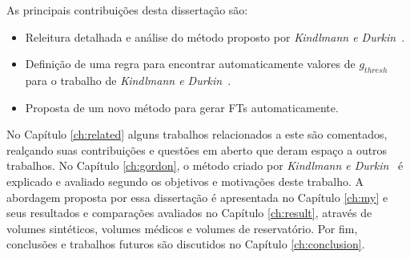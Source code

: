     As principais contribuições desta dissertação são:
\begin{itemize}
   	\item Releitura detalhada e análise do método proposto por \textit{Kindlmann e Durkin}~\cite{gordon}.
   	\item Definição de uma regra para encontrar automaticamente valores de $ g_{thresh} $ para o trabalho de \textit{Kindlmann e Durkin}~\cite{gordon}.
   	\item Proposta de um novo método para gerar FTs automaticamente.
\end{itemize}

    No Capítulo \ref{ch:related} alguns trabalhos relacionados a este são comentados, realçando suas contribuições e questões em aberto que deram espaço a outros trabalhos. No Capítulo \ref{ch:gordon}, o método criado por \textit{Kindlmann e Durkin}~\cite{gordon} é explicado e avaliado segundo os objetivos e motivações deste trabalho. A abordagem proposta por essa dissertação é apresentada no Capítulo \ref{ch:my} e seus resultados e comparações avaliados no Capítulo \ref{ch:result}, através de volumes sintéticos, volumes médicos e volumes de reservatório. Por fim, conclusões e trabalhos futuros são discutidos no Capítulo \ref{ch:conclusion}.